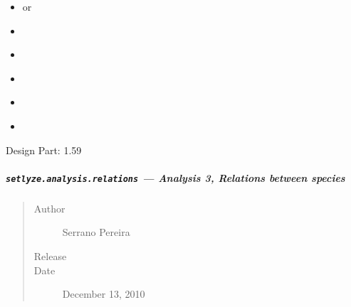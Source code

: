 \documentclass[letterpaper,10pt,english]{sphinxmanual}
\begin{document}
\begin{fulllineitems}
\begin{fulllineitems}
\begin{description}
\begin{itemize}
\item {} 
{\hyperref[setlyze/database:setlyze.database.AccessLocalDB.set_species_spots]{}} or

\item {} 
{\hyperref[setlyze/database:setlyze.database.AccessDBGeneric.make_plates_unique]{}}

\item {} 
{\hyperref[setlyze/analysis/attraction_intra:setlyze.analysis.attraction_intra.Start.calculate_distances_intra]{}}

\item {} 
{\hyperref[setlyze/analysis/attraction_intra:setlyze.analysis.attraction_intra.Start.calculate_distances_intra_expected]{}}

\item {} 
{\hyperref[setlyze/analysis/attraction_intra:setlyze.analysis.attraction_intra.Start.calculate_significance]{}}

\item {} 
{\hyperref[setlyze/analysis/attraction_intra:setlyze.analysis.attraction_intra.Start.generate_report]{}}

\end{itemize}

\end{description}

Design Part: 1.59

\end{fulllineitems}


\end{fulllineitems}



\subparagraph{\texttt{setlyze.analysis.relations} --- Analysis 3, Relations between species}
\label{setlyze/analysis/relations::doc}\label{setlyze/analysis/relations:setlyze-analysis-relations-analysis-3-relations-between-species}\begin{quote}\begin{description}
\item[{Author}] \leavevmode
Serrano Pereira

\item[{Release}] 

\item[{Date}] \leavevmode
December 13, 2010

\end{description}\end{quote}
\end{document}

